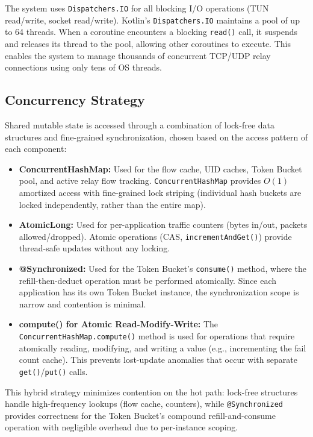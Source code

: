 The system uses \texttt{Dispatchers.IO} for all blocking I/O operations (TUN read/write, socket read/write). Kotlin's \texttt{Dispatchers.IO} maintains a pool of up to 64 threads. When a coroutine encounters a blocking \texttt{read()} call, it suspends and releases its thread to the pool, allowing other coroutines to execute. This enables the system to manage thousands of concurrent TCP/UDP relay connections using only tens of OS threads.

\subsection{Concurrency Strategy}

Shared mutable state is accessed through a combination of lock-free data structures and fine-grained synchronization, chosen based on the access pattern of each component:

\begin{itemize}[noitemsep]
    \item \textbf{ConcurrentHashMap:} Used for the flow cache, UID caches, Token Bucket pool, and active relay flow tracking. \texttt{ConcurrentHashMap} provides $O(1)$ amortized access with fine-grained lock striping (individual hash buckets are locked independently, rather than the entire map).
    \item \textbf{AtomicLong:} Used for per-application traffic counters (bytes in/out, packets allowed/dropped). Atomic operations (CAS, \texttt{incrementAndGet()}) provide thread-safe updates without any locking.
    \item \textbf{@Synchronized:} Used for the Token Bucket's \texttt{consume()} method, where the refill-then-deduct operation must be performed atomically. Since each application has its own Token Bucket instance, the synchronization scope is narrow and contention is minimal.
    \item \textbf{compute() for Atomic Read-Modify-Write:} The \texttt{ConcurrentHashMap.compute()} method is used for operations that require atomically reading, modifying, and writing a value (e.g., incrementing the fail count cache). This prevents lost-update anomalies that occur with separate \texttt{get()}/\texttt{put()} calls.
\end{itemize}

This hybrid strategy minimizes contention on the hot path: lock-free structures handle high-frequency lookups (flow cache, counters), while \texttt{@Synchronized} provides correctness for the Token Bucket's compound refill-and-consume operation with negligible overhead due to per-instance scoping.

